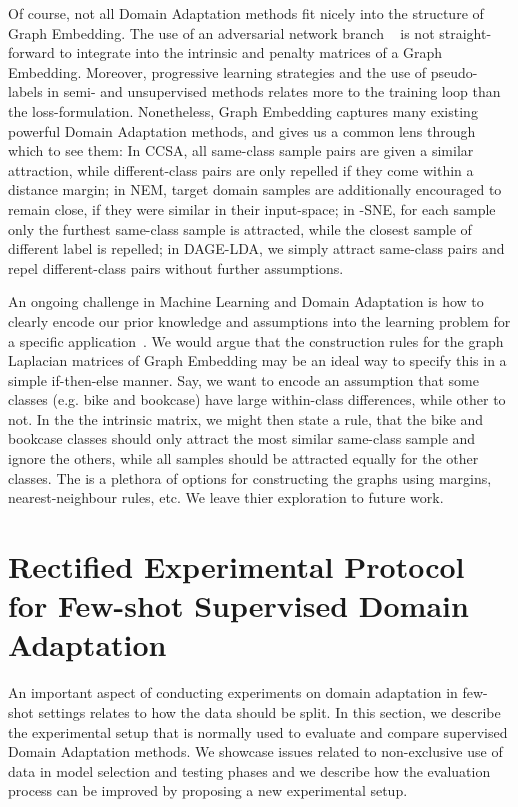 \documentclass[journal]{IEEEtran}
\begin{document}
Of course, not all Domain Adaptation methods fit nicely into the structure of Graph Embedding. The use of an adversarial network branch ~\cite{tzeng2015simultaneous, ganin2016domain, long2018conditional} is not straight-forward to integrate into the intrinsic and penalty matrices of a Graph Embedding. Moreover, progressive learning strategies and the use of pseudo-labels in semi- and unsupervised methods \cite{wang2019nem, chen2019gef} relates more to the training loop than the loss-formulation.
Nonetheless, Graph Embedding captures many existing powerful Domain Adaptation methods, and gives us a common lens through which to see them: 
In CCSA, all same-class sample pairs are given a similar attraction, while different-class pairs are only repelled if they come within a distance margin; 
in NEM, target domain samples are additionally encouraged to remain close, if they were similar in their input-space;
in -SNE, for each sample only the furthest same-class sample is attracted, while the closest sample of different label is repelled; in DAGE-LDA, we simply attract same-class pairs and repel different-class pairs without further assumptions.

An ongoing challenge in Machine Learning and Domain Adaptation is how to clearly encode our prior knowledge and assumptions into the learning problem for a specific application~\cite{kouw2018introduction}.
We would argue that the construction rules for the graph Laplacian matrices of Graph Embedding may be an ideal way to specify this in a simple if-then-else manner. Say, we want to encode an assumption that some classes (e.g. bike and bookcase) have large within-class differences, while other to not. In the the intrinsic matrix, we might then state a rule, that the bike and bookcase classes should only attract the most similar same-class sample and ignore the others, while all samples should be attracted equally for the other classes.
The is a plethora of options for constructing the graphs using margins, nearest-neighbour rules, etc. We leave thier exploration to future work.
 \section{Rectified Experimental Protocol for Few-shot Supervised Domain Adaptation} 
\label{sec:rectified-protocol}
An important aspect of conducting experiments on domain adaptation in few-shot settings relates to how the data should be split.
In this section, we describe the experimental setup that is normally used to evaluate and compare supervised Domain Adaptation methods. We showcase issues related to non-exclusive use of data in model selection and testing phases and we describe how the evaluation process can be improved by proposing a new experimental setup.
\end{document}
